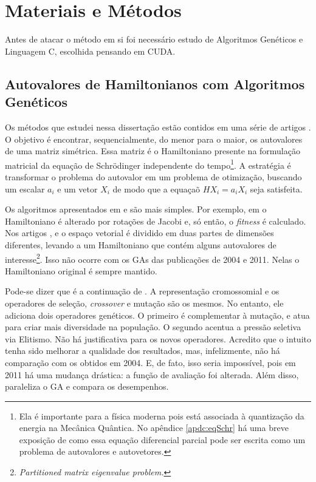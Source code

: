 \chapter{Materiais e Métodos\label{cap:metodologia}}

Antes de atacar o método em si foi necessário estudo de Algoritmos Genéticos e Linguagem C, escolhida pensando em CUDA.

\section{Autovalores de Hamiltonianos com Algoritmos Genéticos\label{sec:metodo}}

	Os métodos que estudei nessa dissertação estão contidos em uma série de artigos \cite{metodo2002, metodo2004, metodo2006, metodo2008, metodo2009, metodo2011}. O objetivo é encontrar, sequencialmente, do menor para o maior, os autovalores de uma matriz simétrica. Essa matriz é o Hamiltoniano presente na formulação matricial da equação de Schrödinger independente do tempo\footnote{Ela é importante para a física moderna pois está associada à quantização da energia na Mecânica Quântica. No apêndice \ref{apdc:eqSchr} há uma breve exposição de como essa equação diferencial parcial pode ser escrita como um problema de autovalores e autovetores.}. A estratégia é transformar o problema do autovalor em um problema de otimização, buscando um escalar $a_i$ e um vetor $X_i$ de modo que a equaçaõ $HX_i = a_iX_i$ seja satisfeita.
	
	Os algoritmos apresentados em \cite{metodo2004} e \cite{metodo2011} são mais simples. Por exemplo, em \cite{metodo2002} o Hamiltoniano é alterado por rotações de Jacobi e, só então, o \emph{fitness} é calculado. Nos artigos \cite{metodo2006}, \cite{metodo2008} e \cite{metodo2009} o espaço vetorial é dividido em duas partes de dimensões diferentes, levando a um Hamiltoniano que contém alguns autovalores de interesse\footnote{\emph{Partitioned matrix eigenvalue problem.}}. Isso não ocorre com os GAs das publicações de 2004 e 2011. Nelas o Hamiltoniano original é sempre mantido.
	
	Pode-se dizer que \cite{metodo2011} é a continuação de \cite{metodo2004}. A representação cromossomial e os operadores de seleção, \emph{crossover} e mutação são os mesmos. No entanto, ele adiciona dois operadores genéticos. O primeiro é complementar à mutação, e atua para criar mais diversidade na população. O segundo acentua a pressão seletiva via Elitismo. Não há justificativa para os novos operadores. Acredito que o intuito tenha sido melhorar a qualidade dos resultados, mas, infelizmente, não há comparação com os obtidos em 2004. E, de fato, isso seria impossível, pois em 2011 há uma mudança drástica: a função de avaliação foi alterada. Além disso, \cite{metodo2011} paraleliza o GA e compara os desempenhos.
	
